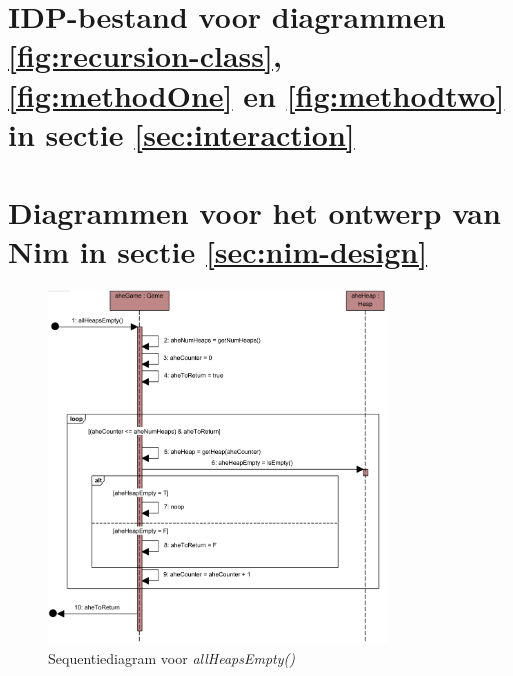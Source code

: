 \chapter{IDP-bestand voor diagrammen \ref{fig:recursion-class}, \ref{fig:methodOne} en \ref{fig:methodtwo} in sectie \ref{sec:interaction}}\label{app:seq-recursion}

\label{code:seq-recursion}

\chapter{Diagrammen voor het ontwerp van Nim in sectie \ref{sec:nim-design}}\label{app:design-nim}


\begin{figure}
	\includegraphics[width=0.8\textwidth]{chap-evaluatie/allHeapsEmpty.png}
	\caption{Sequentiediagram voor \textit{allHeapsEmpty()}}
	\label{fig:nim-allHeapsEmpty}
\end{figure}

